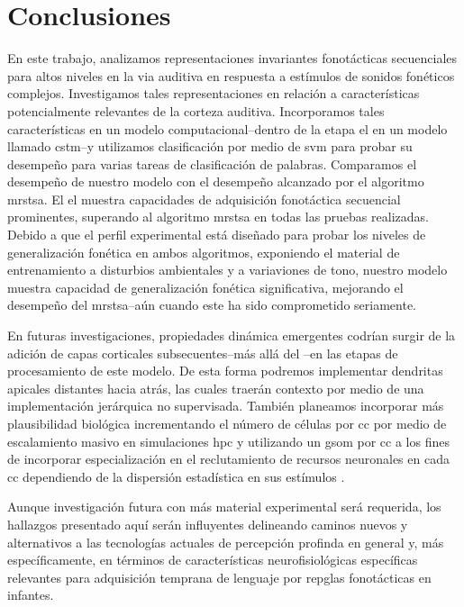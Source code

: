 \section{Conclusiones}

En este trabajo, analizamos representaciones invariantes fonotácticas secuenciales para altos niveles en la via auditiva en respuesta a estímulos de sonidos fonéticos complejos. Investigamos tales representaciones en relación a características potencialmente relevantes de la corteza auditiva. Incorporamos tales características en un modelo computacional--dentro de la etapa \gls{el} en un modelo llamado \gls{cstm}--y utilizamos clasificación por medio de \gls{svm} para probar su desempeño para varias tareas de clasificación de palabras. Comparamos el desempeño de nuestro modelo con el desempeño alcanzado por el algoritmo \gls{mrstsa}. El \gls{el} muestra capacidades de adquisición fonotáctica secuencial prominentes, superando al algoritmo \gls{mrstsa} en todas las pruebas realizadas. Debido a que el perfil experimental está diseñado para probar los niveles de generalización fonética en ambos algoritmos, exponiendo el material de entrenamiento a disturbios ambientales y a variaviones de tono, nuestro modelo muestra capacidad de generalización fonética significativa, mejorando el desempeño del \gls{mrstsa}--aún cuando este ha sido comprometido seriamente. 

En futuras investigaciones, propiedades dinámica emergentes codrían surgir de la adición de capas corticales subsecuentes--más allá del --en las etapas de procesamiento de este modelo. De esta forma podremos implementar dendritas apicales distantes hacia atrás, las cuales traerán contexto por medio de una implementación jerárquica no supervisada. También planeamos incorporar más plausibilidad biológica incrementando el número de células por \gls{cc} por medio de escalamiento masivo en simulaciones \gls{hpc} y utilizando un \gls{gsom} por \gls{cc} a los fines de incorporar especialización en el reclutamiento de recursos neuronales en cada \gls{cc} dependiendo de la dispersión estadística en sus estímulos \cite{Meyer19113}.

Aunque investigación futura con más material experimental será requerida, los hallazgos presentado aquí serán influyentes delineando caminos nuevos y alternativos a las tecnologías actuales de percepción profinda en general y, más específicamente, en términos de características neurofisiológicas específicas relevantes para adquisición temprana de lenguaje por repglas fonotácticas en infantes.









